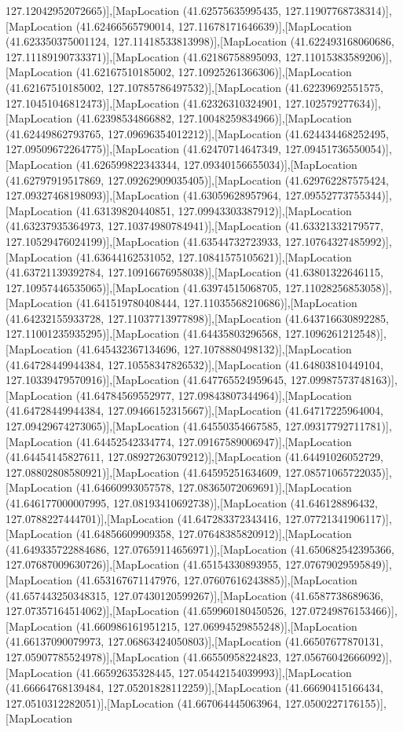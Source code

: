 127.12042952072665)],[MapLocation (41.62575635995435, 127.11907768738314)],[MapLocation (41.62466565790014, 127.11678171646639)],[MapLocation (41.623350375001124, 127.11418533813998)],[MapLocation (41.622493168060686, 127.11189190733371)],[MapLocation (41.62186758895093, 127.11015383589206)],[MapLocation (41.62167510185002, 127.10925261366306)],[MapLocation (41.62167510185002, 127.10785786497532)],[MapLocation (41.62239692551575, 127.10451046812473)],[MapLocation (41.62326310324901, 127.102579277634)],[MapLocation (41.62398534866882, 127.10048259834966)],[MapLocation (41.62449862793765, 127.09696354012212)],[MapLocation (41.624434468252495, 127.09509672264775)],[MapLocation (41.62470714647349, 127.09451736550054)],[MapLocation (41.626599822343344, 127.09340156655034)],[MapLocation (41.62797919517869, 127.09262909035405)],[MapLocation (41.629762287575424, 127.09327468198093)],[MapLocation (41.63059628957964, 127.09552773755344)],[MapLocation (41.63139820440851, 127.09943303387912)],[MapLocation (41.63237935364973, 127.10374980784941)],[MapLocation (41.63321332179577, 127.10529476024199)],[MapLocation (41.63544732723933, 127.10764327485992)],[MapLocation (41.63644162531052, 127.10841575105621)],[MapLocation (41.63721139392784, 127.10916676958038)],[MapLocation (41.63801322646115, 127.10957446535065)],[MapLocation (41.63974515068705, 127.11028256853058)],[MapLocation (41.641519780408444, 127.11035568210686)],[MapLocation (41.64232155933728, 127.11037713977898)],[MapLocation (41.643716630892285, 127.11001235935295)],[MapLocation (41.64435803296568, 127.1096261212548)],[MapLocation (41.645432367134696, 127.1078880498132)],[MapLocation (41.64728449944384, 127.10558347826532)],[MapLocation (41.64803810449104, 127.10339479570916)],[MapLocation (41.647765524959645, 127.09987573748163)],[MapLocation (41.64784569552977, 127.09843807344964)],[MapLocation (41.64728449944384, 127.09466152315667)],[MapLocation (41.64717225964004, 127.09429674273065)],[MapLocation (41.64550354667585, 127.09317792711781)],[MapLocation (41.64452542334774, 127.09167589006947)],[MapLocation (41.64454145827611, 127.08927263079212)],[MapLocation (41.64491026052729, 127.08802808580921)],[MapLocation (41.64595251634609, 127.08571065722035)],[MapLocation (41.64660993057578, 127.08365072069691)],[MapLocation (41.646177000007995, 127.08193410692738)],[MapLocation (41.646128896432, 127.0788227444701)],[MapLocation (41.647283372343416, 127.07721341906117)],[MapLocation (41.64856609909358, 127.07648385820912)],[MapLocation (41.649335722884686, 127.07659114656971)],[MapLocation (41.650682542395366, 127.07687009630726)],[MapLocation (41.65154330893955, 127.07679029595849)],[MapLocation (41.653167671147976, 127.07607616243885)],[MapLocation (41.657443250348315, 127.07430120599267)],[MapLocation (41.6587738689636, 127.07357164514062)],[MapLocation (41.659960180450526, 127.07249876153466)],[MapLocation (41.660986161951215, 127.06994529855248)],[MapLocation (41.66137090079973, 127.06863424050803)],[MapLocation (41.66507677870131, 127.05907785524978)],[MapLocation (41.66550958224823, 127.05676042666092)],[MapLocation (41.66592635328445, 127.05442154039993)],[MapLocation (41.66664768139484, 127.05201828112259)],[MapLocation (41.66690415166434, 127.0510312282051)],[MapLocation (41.667064445063964, 127.0500227176155)],[MapLocation 